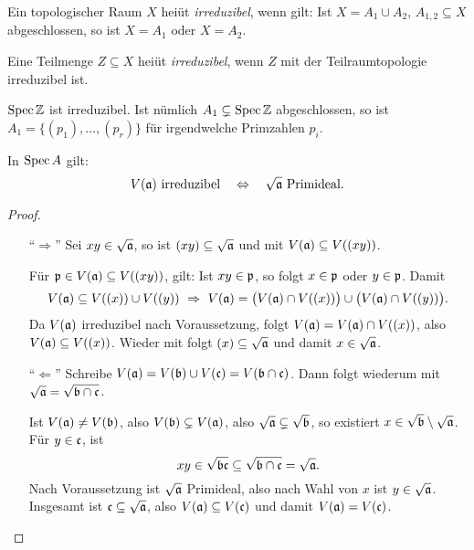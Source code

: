 \begin{definition}[irreduzibel]
	Ein topologischer Raum $X$ heiüt \emph{irreduzibel}, wenn gilt:
	Ist $X = A_1 \cup A_2$, $A_{1,2}\subseteq X$ abgeschlossen, so ist
	$X = A_1$ oder $X = A_2$.
	
	Eine Teilmenge $Z\subseteq X$ heiüt \emph{irreduzibel}, wenn $Z$ mit der
	Teilraumtopologie irreduzibel ist.
\end{definition}

\begin{beispiel}
	$\operatorname{Spec}\mathbb{Z}$ ist irreduzibel. Ist nümlich $A_1 \subsetneq \operatorname{Spec}\mathbb{Z}$ 
	abgeschlossen, so ist $A_1 = \{(p_1), \ldots, (p_r)\}$ für
	irgendwelche Primzahlen $p_i$. 
\end{beispiel}

\begin{lemma}
	\label{lemma:v irreduzibel <=> radikal prim}
	In $\operatorname{Spec} A$ gilt:
	\[
		V(\mathfrak{a}) \text{ irreduzibel} \quad\Leftrightarrow\quad
		\sqrt{\mathfrak{a}} \text{ Primideal}.
	\]
\end{lemma}
\begin{proof}
	\begin{itemize}
	  \item["`$\Rightarrow$"']
	  	Sei $xy \in \sqrt{\mathfrak{a}}$, so ist $(xy) \subseteq \sqrt{\mathfrak{a}}$ und mit
	  	 $V(\mathfrak{a}) \subseteq V((xy))$.
	  	
	  	Für $\mathfrak{p}\in V(\mathfrak{a}) \subseteq V((xy))$, gilt:
	  	Ist $xy \in \mathfrak{p}$, so folgt $x \in \mathfrak{p}$ oder $y\in \mathfrak{p}$. Damit
	  	\[
	  		V(\a) \subseteq V((x)) \cup V((y))
	  		\ \Rightarrow\ 
	  		V(\a) = \big(V(\a) \cap V((x))\big) \cup 
	  				\big(V(\a) \cap V((y))\big).
	  	\]
	  	Da $V(\mathfrak{a})$ irreduzibel nach Voraussetzung, folgt
	  	\obda $V(\mathfrak{a}) = V(\mathfrak{a}) \cap V((x))$, also $V(\mathfrak{a}) \subseteq V((x))$.
	  	Wieder mit \thref{satz:v und radikal} folgt
	  	$(x) \subseteq \sqrt{\mathfrak{a}}$ und damit $x \in \sqrt{\mathfrak{a}}$. 
	 \item["`$\Leftarrow$"']
	 	Schreibe $V(\mathfrak{a}) = V(\mathfrak{b}) \cup V(\mathfrak c) = V(\mathfrak{b}\cap \mathfrak c)$.
	 	Dann folgt wiederum mit 
	 	$\sqrt{\mathfrak{a}} = \sqrt{\mathfrak{b} \cap \mathfrak c}$.
	 	
	 	Ist $V(\mathfrak{a}) \neq V(\mathfrak{b})$, also $V(\mathfrak{b}) \subsetneq V(\mathfrak{a})$, also
	 	$\sqrt{\mathfrak{a}} \subsetneq \sqrt{\mathfrak{b}}$, so existiert 
	 	$x\in \sqrt{\mathfrak{b}} \setminus \sqrt{\mathfrak{a}}$. Für $y \in \mathfrak c$, ist 
	 	\[
	 		xy \in \sqrt{\mathfrak{b}\mathfrak c} \subseteq \sqrt{\mathfrak{b} \cap \mathfrak c} = \sqrt{\mathfrak{a}}.
	 	\]
	 	Nach Voraussetzung ist $\sqrt{\mathfrak{a}}$ Primideal, also 
	 	nach Wahl von $x$ ist $y\in \sqrt{\mathfrak{a}}$.
	 	Insgesamt ist $\mathfrak c \subseteq \sqrt{\mathfrak{a}}$, also
	 	$V(\mathfrak{a}) \subseteq V(\mathfrak c)$	und damit $V(\mathfrak{a}) = V(\mathfrak c)$.
	\end{itemize}
\end{proof}

